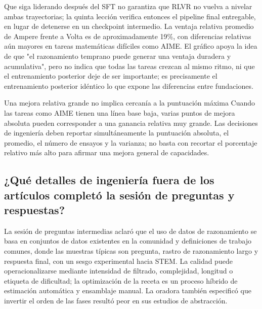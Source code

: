 Que siga liderando después del SFT no garantiza que RLVR no vuelva a nivelar ambas trayectorias; la quinta lección verifica entonces el pipeline final entregable, en lugar de detenerse en un checkpoint intermedio. La ventaja relativa promedio de Ampere frente a Volta es de aproximadamente 19\%, con diferencias relativas aún mayores en tareas matemáticas difíciles como AIME. El gráfico apoya la idea de que "el razonamiento temprano puede generar una ventaja duradera y acumulativa", pero no indica que todas las tareas crezcan al mismo ritmo, ni que el entrenamiento posterior deje de ser importante; es precisamente el entrenamiento posterior idéntico lo que expone las diferencias entre fundaciones.


\begin{warningbox}{Una mejora relativa grande no implica cercanía a la puntuación máxima}
Cuando las tareas como AIME tienen una línea base baja, varias puntos de mejora absoluta pueden corresponder a una ganancia relativa muy grande. Las decisiones de ingeniería deben reportar simultáneamente la puntuación absoluta, el promedio, el número de ensayos y la varianza; no basta con recortar el porcentaje relativo más alto para afirmar una mejora general de capacidades.
\end{warningbox}

\subsection{¿Qué detalles de ingeniería fuera de los artículos completó la sesión de preguntas y respuestas?}

La sesión de preguntas intermedias aclaró que el uso de datos de razonamiento se basa en conjuntos de datos existentes en la comunidad y definiciones de trabajo comunes, donde las muestras típicas son pregunta, rastro de razonamiento largo y respuesta final, con un sesgo experimental hacia STEM. La calidad puede operacionalizarse mediante intensidad de filtrado, complejidad, longitud o etiqueta de dificultad; la optimización de la receta es un proceso híbrido de estimación automática y ensamblaje manual. La oradora también especificó que invertir el orden de las fases resultó peor en sus estudios de abstracción.


